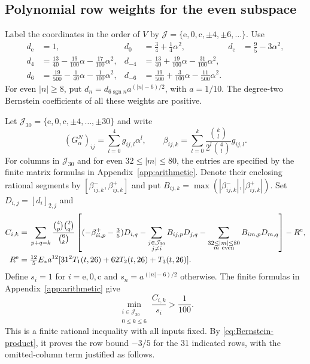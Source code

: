 \documentclass[a4paper,11pt]{article}
\numberwithin{equation}{section}
\theoremstyle{definition}
\theoremstyle{remark}
\begin{document}
\subsection{Polynomial row weights for the even subspace}
Label the coordinates in the order of $V$ by $\mathcal J=\{\mathrm e,0,\mathrm c,\pm4,\pm6,\ldots\}$. Use
\begin{equation}\label{eq:even-weights}
\begin{aligned}
 d_{\mathrm e}&=1,&d_0&=\tfrac34+\tfrac14\alpha^2,&d_{\mathrm c}&=\tfrac95-3\alpha^2,\\
 d_4&=\tfrac{13}{40}-\tfrac{19}{100}\alpha-\tfrac{17}{100}\alpha^2,
 &d_{-4}&=\tfrac{13}{40}+\tfrac{19}{100}\alpha-\tfrac{31}{100}\alpha^2,\\
 d_6&=\tfrac{19}{500}-\tfrac1{40}\alpha-\tfrac1{100}\alpha^2,
 &d_{-6}&=\tfrac{19}{500}+\tfrac3{100}\alpha-\tfrac{11}{500}\alpha^2.
\end{aligned}
\end{equation}
For even $|n|\ge8$, put $d_n=d_{6\operatorname{sgn}n}a^{(|n|-6)/2}$, with $a=1/10$. The degree-two Bernstein coefficients of all these weights are positive.

Let $\mathcal J_{30}=\{\mathrm e,0,\mathrm c,\pm4,\ldots,\pm30\}$ and write
\[
 (G_\alpha^N)_{ij}=\sum_{l=0}^4g_{ij,l}\alpha^l,
 \qquad \beta_{ij,k}=\sum_{l=0}^k\frac{\binom kl}{2^l\binom4l}g_{ij,l}.
\]
For columns in $\mathcal J_{30}$ and for even $32\le|m|\le80$, the entries are specified by the finite matrix formulas in Appendix~\ref{app:arithmetic}. Denote their enclosing rational segments by $[\beta^-_{ij,k},\beta^+_{ij,k}]$ and put $B_{ij,k}=\max(|\beta^-_{ij,k}|,|\beta^+_{ij,k}|)$. Set $D_{i,j}=[d_i]_{2,j}$ and
\begin{equation}\label{eq:even-row-Bernstein}
\begin{aligned}
 C_{i,k}={}&\sum_{p+q=k}\frac{\binom4p\binom2q}{\binom6k}
 \left[(-\beta^+_{ii,p}-\tfrac35)D_{i,q}
 -\sum_{\substack{j\in\mathcal J_{30}\\j\ne i}}B_{ij,p}D_{j,q}
 -\sum_{\substack{32\le|m|\le80\\m\ \mathrm{even}}}B_{im,p}D_{m,q}\right]
 -R^{\rm e},\\
 R^{\rm e}={}&\tfrac{12}{5}E_*a^{12}
 [31^2T_1(t,26)+62T_2(t,26)+T_3(t,26)].
\end{aligned}
\end{equation}
Define $s_i=1$ for $i=\mathrm e,0,\mathrm c$ and $s_n=a^{(|n|-6)/2}$ otherwise. The finite formulas in Appendix~\ref{app:arithmetic} give
\begin{equation}\label{eq:even-uniform}
 \min_{\substack{i\in\mathcal J_{30}\\0\le k\le6}}\frac{C_{i,k}}{s_i}>\frac1{100}.
\end{equation}
This is a finite rational inequality with all inputs fixed. By \eqref{eq:Bernstein-product}, it proves the row bound $-3/5$ for the 31 indicated rows, with the omitted-column term justified as follows.
\end{document}
